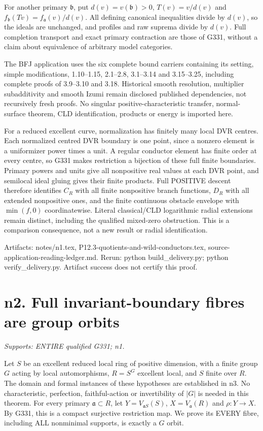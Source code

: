 \documentclass[11pt]{article}
\begin{document}
For another primary $\mathfrak b$, put $d(v)=v(\mathfrak b)>0$,
$T(v)=v/d(v)$ and $f_{\mathfrak b}(Tv)=f_{\mathfrak a}(v)/d(v)$.
All defining canonical inequalities divide by $d(v)$, so the ideals are
unchanged, and profiles and raw suprema divide by $d(v)$. Full completion
transport and exact primary contraction are those of G331, without a
claim about equivalence of arbitrary model categories.

The BFJ application uses the six complete bound carriers containing its
setting, simple modifications, 1.10--1.15, 2.1--2.8, 3.1--3.14 and
3.15--3.25, including complete proofs of 3.9--3.10 and 3.18.
Historical smooth resolution, multiplier subadditivity and smooth Izumi
remain disclosed published dependencies, not recursively fresh proofs.
No singular positive-characteristic transfer, normal-surface theorem,
CLD identification, products or energy is imported here.

For a reduced excellent curve, normalization has finitely many local DVR
centres. Each normalized centred DVR boundary is one point, since a
nonzero element is a uniformizer power times a unit. A regular conductor
element has finite order at every centre, so G331 makes restriction a
bijection of these full finite boundaries. Primary powers and units give
all nonpositive real values at each DVR point, and semilocal ideal gluing
gives their finite products. Full POSITIVE descent therefore identifies
$C_R$ with all finite nonpositive branch functions, $D_R$ with all extended
nonpositive ones, and the finite continuous obstacle envelope with
$\min(f,0)$ coordinatewise. Literal classical/CLD logarithmic radial
extensions remain distinct, including the qualified mixed-zero obstruction.
This is a comparison consequence, not a new result or radial identification.

Artifacts: notes/n1.tex, P12.3-quotients-and-wild-conductors.tex,
source-application-reading-ledger.md. Rerun: python build\_delivery.py;
python verify\_delivery.py. Artifact success does not certify this proof.

\section{n2. Full invariant-boundary fibres are group orbits}
\textit{Supports: ENTIRE qualified G331; n1.}

Let $S$ be an excellent reduced local ring of positive dimension, with a finite group $G$ acting
by local automorphisms, $R=S^G$ excellent local, and $S$ finite over $R$.
The domain and formal instances of these hypotheses are established in n3.
No characteristic, perfection, faithful-action or invertibility of $|G|$
is needed in this theorem. For every primary $\mathfrak a\subset R$, let
$Y=V_{\mathfrak aS}(S)$, $X=V_{\mathfrak a}(R)$ and $\rho:Y\to X$.
By G331, this is a compact surjective restriction map. We prove its
EVERY fibre, including ALL nonminimal supports, is exactly a $G$ orbit.
\end{document}
